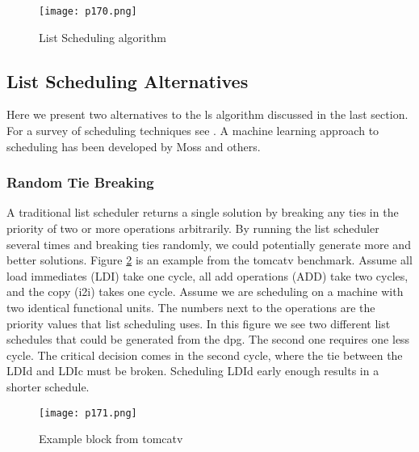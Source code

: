 \begin{figure}[H]
	\centering
	\texttt{[image: p170.png]}
	\caption{List Scheduling algorithm}
	\label{fig:p170}
\end{figure}


\subsection{List Scheduling Alternatives}

Here we present two alternatives to the ls algorithm discussed in the last section. For a survey of scheduling
techniques see . A machine learning approach to scheduling has been developed by Moss and others.



\subsubsection{Random Tie Breaking}

A traditional list scheduler returns a single solution by breaking any ties in the priority of two or more
operations arbitrarily. By running the list scheduler several times and breaking ties randomly, we could
potentially generate more and better solutions. Figure \ref{fig:p171} is an example from the tomcatv benchmark. Assume
all load immediates (LDI) take one cycle, all add operations (ADD) take two cycles, and the copy (i2i) takes
one cycle. Assume we are scheduling on a machine with two identical functional units. The numbers next
to the operations are the priority values that list scheduling uses. In this figure we see two different list
schedules that could be generated from the dpg. The second one requires one less cycle. The critical decision
comes in the second cycle, where the tie between the LDId and LDIc must be broken. Scheduling LDId early
enough results in a shorter schedule.

\begin{figure}[H]
	\centering
	\texttt{[image: p171.png]}
	\caption{Example block from tomcatv}
	\label{fig:p171}
\end{figure}

